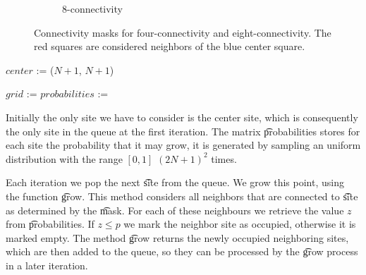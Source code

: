 \begin{figure}
\begin{subfigure}{0.45\columnwidth}
		\caption{8-connectivity}
		\label{fig:exp:connectivity:eightMask}
	\end{subfigure}	
	\caption{Connectivity masks for  four-connectivity and  eight-connectivity. The red squares are considered neighbors of the blue center square.}
	\label{fig:exp:connectivity}
\end{figure}

\begin{algorithm}[t]
	\SetAlgoShortEnd
	\DontPrintSemicolon
	\BlankLine

	$center$ := ($N + 1$, $N + 1$)\; 

	\; 
	$grid$ := \; 
	$probabilities$ := \; 

	\; 
	\caption{$(mask, N, p)$\label{alg:percolation}}
\end{algorithm}

Initially the only site we have to consider is the center site, which is consequently the only site in the queue at the first iteration. The matrix \t{probabilities} stores for each site the probability that it may grow, it is generated by sampling an uniform distribution with the range $[0,1]$ $(2N + 1)^2$ times. 

Each iteration we pop the next \t{site} from the queue. We grow this point, using the function \t{grow}. This method considers all neighbors that are connected to \t{site} as determined by the \t{mask}. For each of these neighbours we retrieve the value $z$ from \t{probabilities}. If $z \leq p$ we mark the neighbor site as occupied, otherwise it is marked empty. The method \t{grow} returns the newly occupied neighboring sites, which are then added to the queue, so they can be processed by the \t{grow} process in a later iteration.

